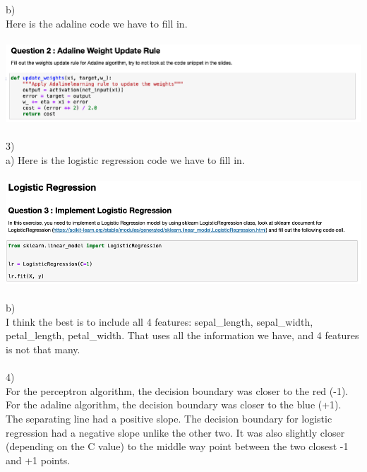 \documentclass[11pt]{article}
\begin{document}
b) \\
Here is the adaline code we have to fill in. \\
\\
\includegraphics[scale=0.4]{adalinecode}
\\
\\
3) \\
a) 
Here is the logistic regression code we have to fill in. \\
\\
\includegraphics[scale=0.4]{logistic}
\\
\\
b) \\
I think the best is to include all 4 features: sepal\_length, sepal\_width, petal\_length, petal\_width. That uses all the information we have, and 4 features is not that many.
\\
\\
4) \\
For the perceptron algorithm, the decision boundary was closer to the red (-1). For the adaline algorithm, the decision boundary was closer to the blue (+1). The separating line had a positive slope. The decision boundary for logistic regression had a negative slope unlike the other two. It was also slightly closer (depending on the C value) to the middle way point between the two closest -1 and +1 points.
\end{document}
